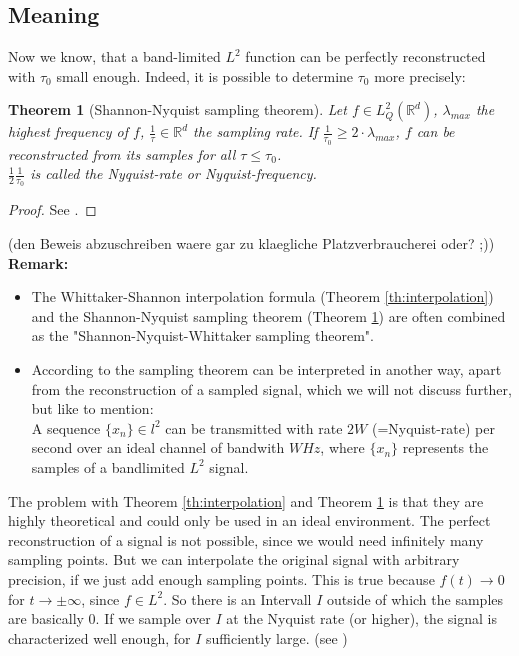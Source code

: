 \documentclass[a4paper, 11pt]{scrreprt}
\newtheorem{theorem}[defi]{Theorem}
\newcommand{\RR}{\mathbb{R}}
\begin{document}
\subsection{Meaning}

Now we know, that a band-limited \(L^2\) function can be perfectly reconstructed with \(\tau_0\) small enough. Indeed, it is possible to determine \(\tau_0\) more precisely:
\begin{theorem}[Shannon-Nyquist sampling theorem]
\label{th:sampling}
Let \(f\in L^2_Q(\RR^d)\), \(\lambda_{max}\) the highest frequency of \(f\), \(\frac{1}{\tau}\in \RR^d\) the sampling rate. If \(\frac{1}{\tau_0} \geq 2\cdot \lambda_{max}\), \(f\) can be reconstructed from its samples for all \(\tau \leq \tau_0\).\\
\(\frac 1 2 \frac{1}{\tau_0}\) is called the Nyquist-rate or Nyquist-frequency.
\end{theorem} 
\begin{proof}
See \cite{shannon01}.
\end{proof}
(den Beweis abzuschreiben waere gar zu klaegliche Platzverbraucherei oder? ;))\\
\textbf{Remark:}
\begin{itemize}
\item The Whittaker-Shannon interpolation formula (Theorem  \ref{th:interpolation}) and the Shannon-Nyquist sampling theorem (Theorem \ref{th:sampling}) are often combined as the "Shannon-Nyquist-Whittaker sampling theorem".
\item According to \cite{landau04} the sampling theorem can be interpreted in another way,  apart from the reconstruction of a sampled signal, which we will not discuss further, but like to mention: \\
A sequence \(\{x_n\}\in l^2\) can be transmitted with rate \(2W\) (=Nyquist-rate) per second over an ideal channel of bandwith \(W Hz\), where \(\{x_n\}\) represents the samples of a bandlimited \(L^2\) signal.

\end{itemize}
The problem with Theorem  \ref{th:interpolation} and Theorem \ref{th:sampling} is that they are highly theoretical and could only be used in an ideal environment. The perfect reconstruction of a signal is not possible, since we would need infinitely many sampling points. But we can interpolate the original signal with arbitrary precision, if we just add enough sampling points. This is true because \(f(t)\to 0\) for \(t\to\pm\infty\), since \(f\in L^2\). So there is an Intervall \(I\) outside of which the samples are basically 0. If we sample over \(I\) at the Nyquist rate (or higher), the signal is characterized well enough, for \(I\) sufficiently large. (see \cite{marks02})\\
\end{document}
